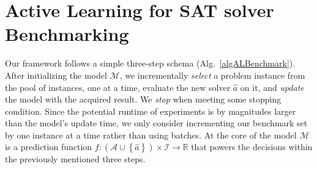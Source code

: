 \documentclass[runningheads]{llncs}
\begin{document}
\section{Active Learning for SAT solver Benchmarking}
\label{sec:main}
Our framework follows a simple three-step schema (Alg.~\ref{algALBenchmark}).
After initializing the model $\mathcal{M}$, we incrementally \emph{select} a problem instance from the pool of instances, one at a time, evaluate the new solver $\hat{a}$ on it, and \emph{update} the model with the acquired result.
We \emph{stop} when meeting some stopping condition.
Since the potential runtime of experiments is by magnitudes larger than the model's update time, we only consider incrementing our benchmark set by one instance at a time rather than using batches.
At the core of the model $\mathcal{M}$ is a prediction function $f\!: \left(\mathcal{A} \cup \left\lbrace \hat{a} \right\rbrace\right) \times \mathcal{I} \rightarrow \mathbb{R}$ that powers the decisions within the previously mentioned three steps.
\end{document}

